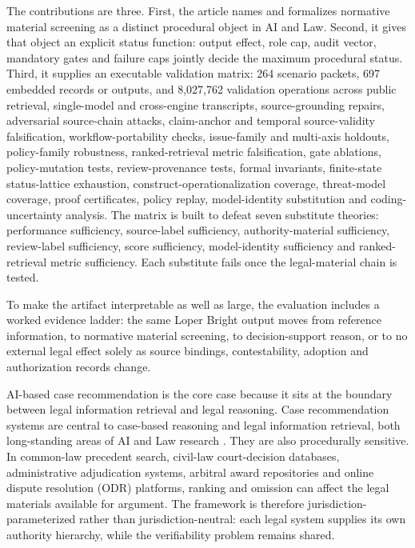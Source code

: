 \documentclass[12pt,a4paper]{article}
\begin{document}
The contributions are three. First, the article names and formalizes normative material screening as a distinct procedural object in AI and Law. Second, it gives that object an explicit status function: output effect, role cap, audit vector, mandatory gates and failure caps jointly decide the maximum procedural status. Third, it supplies an executable validation matrix: 264 scenario packets, 697 embedded records or outputs, and 8,027,762 validation operations across public retrieval, single-model and cross-engine transcripts, source-grounding repairs, adversarial source-chain attacks, claim-anchor and temporal source-validity falsification, workflow-portability checks, issue-family and multi-axis holdouts, policy-family robustness, ranked-retrieval metric falsification, gate ablations, policy-mutation tests, review-provenance tests, formal invariants, finite-state status-lattice exhaustion, construct-operationalization coverage, threat-model coverage, proof certificates, policy replay, model-identity substitution and coding-uncertainty analysis. The matrix is built to defeat seven substitute theories: performance sufficiency, source-label sufficiency, authority-material sufficiency, review-label sufficiency, score sufficiency, model-identity sufficiency and ranked-retrieval metric sufficiency. Each substitute fails once the legal-material chain is tested.

To make the artifact interpretable as well as large, the evaluation includes a worked evidence ladder: the same Loper Bright output moves from reference information, to normative material screening, to decision-support reason, or to no external legal effect solely as source bindings, contestability, adoption and authorization records change.

AI-based case recommendation is the core case because it sits at the boundary between legal information retrieval and legal reasoning. Case recommendation systems are central to case-based reasoning and legal information retrieval, both long-standing areas of AI and Law research \citep{ashley1992,rissland1995,vanopijnen2017}. They are also procedurally sensitive. In common-law precedent search, civil-law court-decision databases, administrative adjudication systems, arbitral award repositories and online dispute resolution (ODR) platforms, ranking and omission can affect the legal materials available for argument. The framework is therefore jurisdiction-parameterized rather than jurisdiction-neutral: each legal system supplies its own authority hierarchy, while the verifiability problem remains shared.
\end{document}
